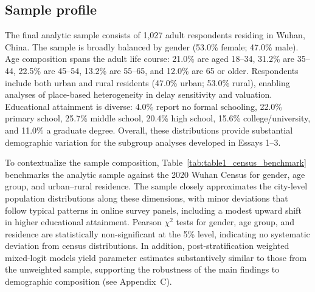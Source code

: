 \documentclass[doublespacing]{utdthesis}
\begin{document}
\subsection{Sample profile}
\label{subsec:sample_profile}

The final analytic sample consists of 1{,}027 adult respondents residing in Wuhan, China. The sample is broadly balanced by gender (53.0\% female; 47.0\% male). Age composition spans the adult life course: 21.0\% are aged 18--34, 31.2\% are 35--44, 22.5\% are 45--54, 13.2\% are 55--65, and 12.0\% are 65 or older. Respondents include both urban and rural residents (47.0\% urban; 53.0\% rural), enabling analyses of place-based heterogeneity in delay sensitivity and valuation. Educational attainment is diverse: 4.0\% report no formal schooling, 22.0\% primary school, 25.7\% middle school, 20.4\% high school, 15.6\% college/university, and 11.0\% a graduate degree. Overall, these distributions provide substantial demographic variation for the subgroup analyses developed in Essays 1--3.

To contextualize the sample composition, Table~\ref{tab:table1_census_benchmark} benchmarks the analytic sample against the 2020 Wuhan Census for gender, age group, and urban--rural residence. The sample closely approximates the city-level population distributions along these dimensions, with minor deviations that follow typical patterns in online survey panels, including a modest upward shift in higher educational attainment. Pearson $\chi^2$ tests for gender, age group, and residence are statistically non-significant at the 5\% level, indicating no systematic deviation from census distributions. In addition, post-stratification weighted mixed-logit models yield parameter estimates substantively similar to those from the unweighted sample, supporting the robustness of the main findings to demographic composition (see Appendix~C).
\end{document}
